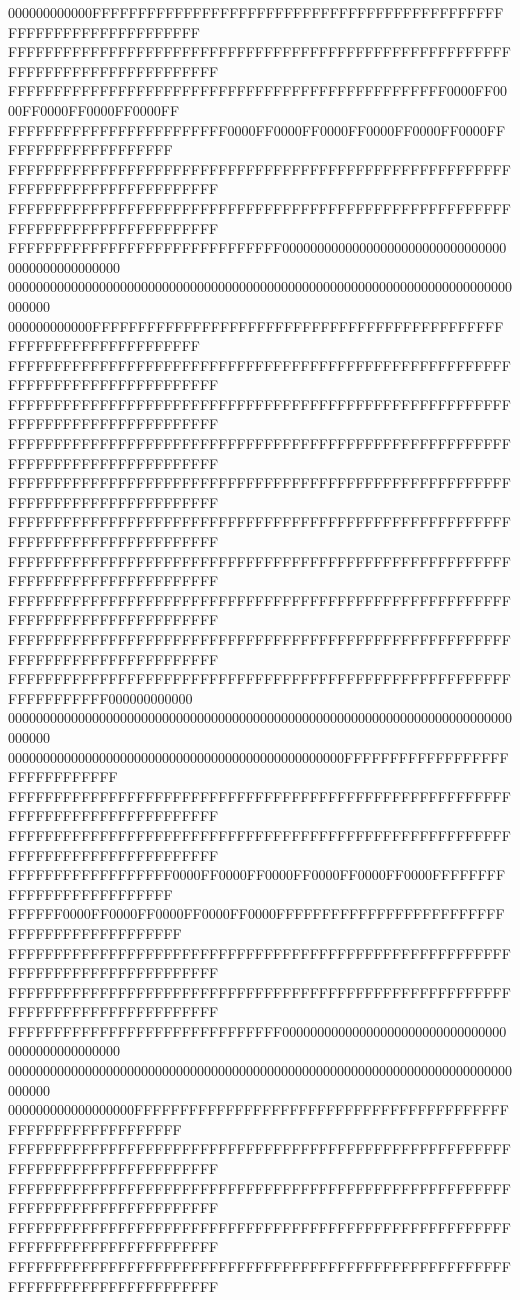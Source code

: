 000000000000FFFFFFFFFFFFFFFFFFFFFFFFFFFFFFFFFFFFFFFFFFFFFFFFFFFFFFFFFFFFFFFFFF
FFFFFFFFFFFFFFFFFFFFFFFFFFFFFFFFFFFFFFFFFFFFFFFFFFFFFFFFFFFFFFFFFFFFFFFFFFFFFF
FFFFFFFFFFFFFFFFFFFFFFFFFFFFFFFFFFFFFFFFFFFFFFFF0000FF0000FF0000FF0000FF0000FF
FFFFFFFFFFFFFFFFFFFFFFFF0000FF0000FF0000FF0000FF0000FF0000FFFFFFFFFFFFFFFFFFFF
FFFFFFFFFFFFFFFFFFFFFFFFFFFFFFFFFFFFFFFFFFFFFFFFFFFFFFFFFFFFFFFFFFFFFFFFFFFFFF
FFFFFFFFFFFFFFFFFFFFFFFFFFFFFFFFFFFFFFFFFFFFFFFFFFFFFFFFFFFFFFFFFFFFFFFFFFFFFF
FFFFFFFFFFFFFFFFFFFFFFFFFFFFFF000000000000000000000000000000000000000000000000
000000000000000000000000000000000000000000000000000000000000000000000000000000
000000000000FFFFFFFFFFFFFFFFFFFFFFFFFFFFFFFFFFFFFFFFFFFFFFFFFFFFFFFFFFFFFFFFFF
FFFFFFFFFFFFFFFFFFFFFFFFFFFFFFFFFFFFFFFFFFFFFFFFFFFFFFFFFFFFFFFFFFFFFFFFFFFFFF
FFFFFFFFFFFFFFFFFFFFFFFFFFFFFFFFFFFFFFFFFFFFFFFFFFFFFFFFFFFFFFFFFFFFFFFFFFFFFF
FFFFFFFFFFFFFFFFFFFFFFFFFFFFFFFFFFFFFFFFFFFFFFFFFFFFFFFFFFFFFFFFFFFFFFFFFFFFFF
FFFFFFFFFFFFFFFFFFFFFFFFFFFFFFFFFFFFFFFFFFFFFFFFFFFFFFFFFFFFFFFFFFFFFFFFFFFFFF
FFFFFFFFFFFFFFFFFFFFFFFFFFFFFFFFFFFFFFFFFFFFFFFFFFFFFFFFFFFFFFFFFFFFFFFFFFFFFF
FFFFFFFFFFFFFFFFFFFFFFFFFFFFFFFFFFFFFFFFFFFFFFFFFFFFFFFFFFFFFFFFFFFFFFFFFFFFFF
FFFFFFFFFFFFFFFFFFFFFFFFFFFFFFFFFFFFFFFFFFFFFFFFFFFFFFFFFFFFFFFFFFFFFFFFFFFFFF
FFFFFFFFFFFFFFFFFFFFFFFFFFFFFFFFFFFFFFFFFFFFFFFFFFFFFFFFFFFFFFFFFFFFFFFFFFFFFF
FFFFFFFFFFFFFFFFFFFFFFFFFFFFFFFFFFFFFFFFFFFFFFFFFFFFFFFFFFFFFFFFFF000000000000
000000000000000000000000000000000000000000000000000000000000000000000000000000
000000000000000000000000000000000000000000000000FFFFFFFFFFFFFFFFFFFFFFFFFFFFFF
FFFFFFFFFFFFFFFFFFFFFFFFFFFFFFFFFFFFFFFFFFFFFFFFFFFFFFFFFFFFFFFFFFFFFFFFFFFFFF
FFFFFFFFFFFFFFFFFFFFFFFFFFFFFFFFFFFFFFFFFFFFFFFFFFFFFFFFFFFFFFFFFFFFFFFFFFFFFF
FFFFFFFFFFFFFFFFFF0000FF0000FF0000FF0000FF0000FF0000FFFFFFFFFFFFFFFFFFFFFFFFFF
FFFFFF0000FF0000FF0000FF0000FF0000FFFFFFFFFFFFFFFFFFFFFFFFFFFFFFFFFFFFFFFFFFFF
FFFFFFFFFFFFFFFFFFFFFFFFFFFFFFFFFFFFFFFFFFFFFFFFFFFFFFFFFFFFFFFFFFFFFFFFFFFFFF
FFFFFFFFFFFFFFFFFFFFFFFFFFFFFFFFFFFFFFFFFFFFFFFFFFFFFFFFFFFFFFFFFFFFFFFFFFFFFF
FFFFFFFFFFFFFFFFFFFFFFFFFFFFFF000000000000000000000000000000000000000000000000
000000000000000000000000000000000000000000000000000000000000000000000000000000
000000000000000000FFFFFFFFFFFFFFFFFFFFFFFFFFFFFFFFFFFFFFFFFFFFFFFFFFFFFFFFFFFF
FFFFFFFFFFFFFFFFFFFFFFFFFFFFFFFFFFFFFFFFFFFFFFFFFFFFFFFFFFFFFFFFFFFFFFFFFFFFFF
FFFFFFFFFFFFFFFFFFFFFFFFFFFFFFFFFFFFFFFFFFFFFFFFFFFFFFFFFFFFFFFFFFFFFFFFFFFFFF
FFFFFFFFFFFFFFFFFFFFFFFFFFFFFFFFFFFFFFFFFFFFFFFFFFFFFFFFFFFFFFFFFFFFFFFFFFFFFF
FFFFFFFFFFFFFFFFFFFFFFFFFFFFFFFFFFFFFFFFFFFFFFFFFFFFFFFFFFFFFFFFFFFFFFFFFFFFFF
